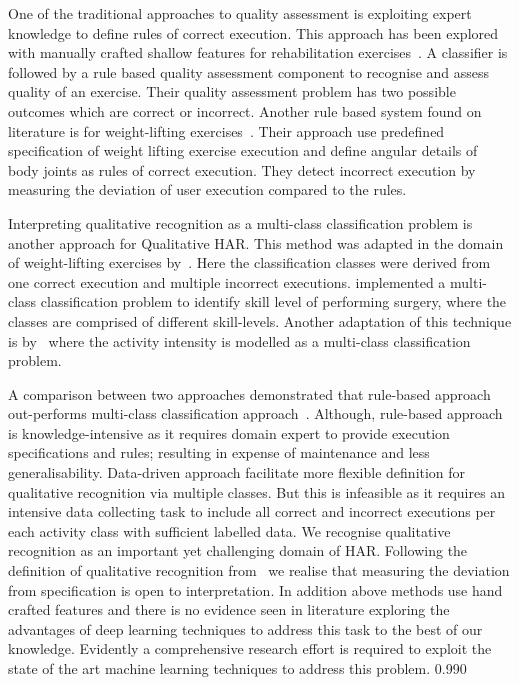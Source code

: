\documentclass[runningheads]{llncs}
\begin{document}
One of the traditional approaches to quality assessment is exploiting expert knowledge to define rules of correct execution. This approach has been explored with manually crafted shallow features for rehabilitation exercises~\cite{chen2013rehabilitation}. A classifier is followed by a rule based quality assessment component to recognise and assess quality of an exercise. Their quality assessment problem has two possible outcomes which are correct or incorrect. 
Another rule based system found on literature is for weight-lifting exercises~\cite{velloso2013qualitative}. Their approach use predefined specification of weight lifting exercise execution and define angular details of body joints as rules of correct execution. They detect incorrect execution by measuring the deviation of user execution compared to the rules. 

Interpreting qualitative recognition as a multi-class classification problem is another approach for Qualitative HAR.
This method was adapted in the domain of weight-lifting exercises by~\cite{velloso2013qualitative}. Here the classification classes were derived from one correct execution and multiple incorrect executions. \cite{khan2015beyond} implemented a multi-class classification problem to identify skill level of performing surgery, where the classes are comprised of different skill-levels. Another adaptation of this technique is by~\cite{garcia2011statistical} where the activity intensity is modelled as a multi-class classification problem.

A comparison between two approaches demonstrated that rule-based approach out-performs multi-class classification approach~\cite{velloso2013qualitative}. Although, rule-based approach is knowledge-intensive as it requires domain expert to provide execution specifications and rules; resulting in expense of maintenance and less generalisability.
Data-driven approach facilitate more flexible definition for qualitative recognition via multiple classes. But this is infeasible as it requires an intensive data collecting task to include all correct and incorrect executions per each activity class with sufficient labelled data. 
We recognise qualitative recognition as an important yet challenging domain of HAR. Following the definition of qualitative recognition from~\cite{velloso2013qualitative} we realise that measuring the deviation from specification is open to interpretation. In addition above methods use hand crafted features and there is no evidence seen in literature exploring the advantages of deep learning techniques to address this task to the best of our knowledge. Evidently a comprehensive research effort is required to exploit the state of the art machine learning techniques to address this problem. 
0.990
\clearpage
\end{document}

